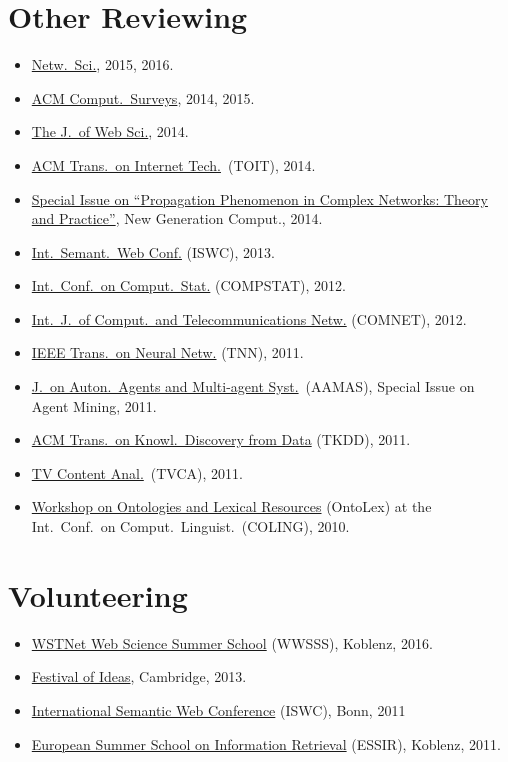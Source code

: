 \documentclass[line,mm]{res}
\newcounter{x}
\newcounter{y}
\begin{document}
\begin{resume}
\section{Other Reviewing}
\begin{itemize}
\item \href{http://journals.cambridge.org/action/displayJournal?jid=NWS}{Netw.\ Sci.}, 2015, 2016.
\item \href{http://surveys.acm.org/}{ACM Comput.\ Surveys}, 2014, 2015. 
\item \href{http://www.webscience-journal.net}{The J.\ of Web Sci.}, 2014. 
\item \href{http://toit.acm.org/}{ACM Trans.\ on Internet
  Tech.}\ (TOIT), 2014.  
\item \href{http://www.ii.pwr.wroc.pl/~krol/eng_EPP.htm}{Special
  Issue on ``Propagation Phenomenon in Complex Networks:  Theory and
  Practice''}, New Generation Comput., 2014. 
\item \href{http://iswc2013.semanticweb.org/}{Int.\ Semant.\ Web Conf.}
  (ISWC), 2013.  
\item \href{http://www.compstat2012.org/}{Int.\ Conf.\ on Comput.\ Stat.} (COMPSTAT), 2012.  
\item
  \href{http://www.journals.elsevier.com/computer-networks/}{Int.\ J.\ of
    Comput.\ and Telecommunications Netw.} (COMNET), 2012. 
\item \href{http://ieee-cis.org/pubs/tnn/}{IEEE Trans.\ on Neural
  Netw.} (TNN), 2011.   
\item
  \href{http://www.springer.com/computer/ai/journal/10458}{J.\ on Auton.\ Agents and Multi-agent Syst.}\ (AAMAS), Special Issue on Agent Mining,
  2011. 
\item \href{http://tkdd.cs.uiuc.edu/}{ACM Trans.\ on Knowl.\ Discovery from Data} (TKDD), 2011.  
\item \href{http://mklab.iti.gr/tvca/}{TV Content Anal.}\ (TVCA), 2011.
\item \href{http://www.loa-cnr.it/ontolex2010}{Workshop on Ontologies
  and Lexical Resources} (OntoLex) at the Int.\ Conf.\ on Comput.\ Linguist.\ (COLING), 2010. 
\end{itemize}

\section{Volunteering}
\begin{itemize}
  \item \href{http://wwsss16.webscience.org/}{WSTNet Web Science Summer School} (WWSSS), Koblenz, 2016. 
  \item \href{http://www.festivalofideas.cam.ac.uk/}{Festival of Ideas}, Cambridge, 2013. 
  \item \href{http://iswc2011.semanticweb.org/}{International Semantic Web Conference} (ISWC), Bonn, 2011
  \item \href{https://essir.uni-koblenz.de/}{European Summer School on Information Retrieval} (ESSIR), Koblenz, 2011. 
\end{itemize}


\end{resume}
\end{document}
